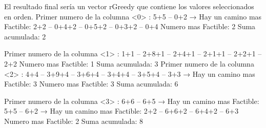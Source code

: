 \documentclass[12pt, letterpaper]{article}
\begin{document}
\begin{itemize}
            El resultado final sería un vector rGreedy que contiene los valores seleccionados en orden.
            \newline
            Primer numero de la columna <0> : 5+5 -- 0+2\newline
              → Hay un camino mas Factible: 2+2 -- 0+4+2 -- 0+5+2 -- 0+3+2 -- 0+4\newline
            Numero mas Factible: 2\newline
            Suma acumulada: 2\newline\newline

            Primer numero de la columna <1> : 1+1 -- 2+8+1 -- 2+4+1 -- 2+1+1 -- 2+2+1 -- 2+2\newline
            Numero mas Factible: 1\newline
            Suma acumulada: 3
  \newpage %
            Primer numero de la columna <2> : 4+4 -- 3+9+4 -- 3+6+4 -- 3+4+4 -- 3+5+4 -- 3+3\newline
              → Hay un camino mas Factible: 3\newline
            Numero mas Factible: 3\newline
            Suma acumulada: 6\newline\newline

            Primer numero de la columna <3> : 6+6 -- 6+5\newline
              → Hay un camino mas Factible: 5+5 -- 6+2\newline
              → Hay un camino mas Factible: 2+2 -- 6+6+2 -- 6+4+2 -- 6+3\newline
            Numero mas Factible: 2\newline
            Suma acumulada: 8\newline\newline


\end{itemize}
\end{document}
